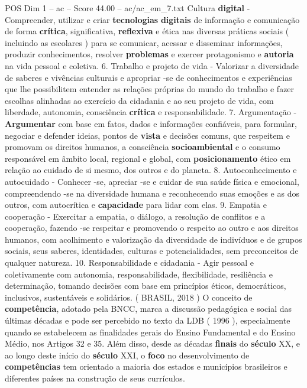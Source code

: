 \begin{textsample}{POS Dim 1 – ac – Score 44.00 – ac/ac\_em\_7.txt}
Cultura \textbf{digital} - Compreender, utilizar e criar \textbf{tecnologias} \textbf{digitais} de informação e comunicação de forma \textbf{crítica}, significativa, \textbf{reflexiva} e ética nas diversas práticas sociais ( incluindo as escolares ) para se comunicar, acessar e disseminar informações, produzir conhecimentos, resolver \textbf{problemas} e exercer protagonismo e \textbf{autoria} na vida pessoal e coletiva. 6.
Trabalho e projeto de vida - Valorizar a diversidade de saberes e vivências culturais e apropriar -se de conhecimentos e experiências que lhe possibilitem entender as relações próprias do mundo do trabalho e fazer escolhas alinhadas ao exercício da cidadania e ao seu projeto de vida, com liberdade, autonomia, consciência \textbf{crítica} e responsabilidade. 7.
Argumentação - \textbf{Argumentar} com base em fatos, dados e informações confiáveis, para formular, negociar e defender ideias, pontos de \textbf{vista} e decisões comuns, que respeitem e promovam os direitos humanos, a consciência \textbf{socioambiental} e o consumo responsável em âmbito local, regional e global, com \textbf{posicionamento} ético em relação ao cuidado de si mesmo, dos outros e do planeta. 8.
Autoconhecimento e autocuidado - Conhecer -se, apreciar -se e cuidar de sua saúde física e emocional, compreendendo -se na diversidade humana e reconhecendo suas emoções e as dos outros, com autocrítica e \textbf{capacidade} para lidar com elas. 9.
Empatia e cooperação - Exercitar a empatia, o diálogo, a resolução de conflitos e a cooperação, fazendo -se respeitar e promovendo o respeito ao outro e aos direitos humanos, com acolhimento e valorização da diversidade de indivíduos e de grupos sociais, seus saberes, identidades, culturas e potencialidades, sem preconceitos de qualquer natureza. 10.
Responsabilidade e cidadania - Agir pessoal e coletivamente com autonomia, responsabilidade, flexibilidade, resiliência e determinação, tomando decisões com base em princípios éticos, democráticos, inclusivos, sustentáveis e solidários. ( BRASIL, 2018 ) O conceito de \textbf{competência}, adotado pela BNCC, marca a discussão pedagógica e social das últimas décadas e pode ser percebido no texto da LDB ( 1996 ), especialmente quando se estabelecem as finalidades gerais do Ensino Fundamental e do Ensino Médio, nos Artigos 32 e 35.
Além disso, desde as décadas \textbf{finais} do \textbf{século} XX, e ao longo deste início do \textbf{século} XXI, o \textbf{foco} no desenvolvimento de \textbf{competências} tem orientado a maioria dos estados e municípios brasileiros e diferentes países na construção de seus currículos.

\end{textsample}
